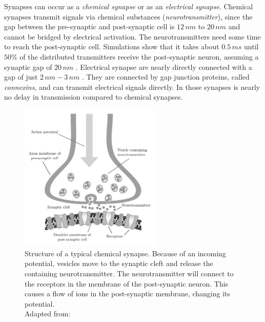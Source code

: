 Synapses can occur as a \emph{chemical synapse} or as an \emph{electrical synapse}. Chemical synapses transmit signals via chemical substances (\emph{neurotransmitter}), since the gap between the pre-synaptic and post-synaptic cell is $12\,nm$ to $20\,nm$ \parencite{savtchenko2007optimal} and cannot be bridged by electrical activation. The neurotransmitters need some time to reach the post-synaptic cell. Simulations show that it takes about $0.5\,ms$ until $50\%$ of the distributed transmitters receive the post-synaptic neuron, assuming a synaptic gap of $20\,nm$ \parencite{clements1996transmitter}. Electrical synapse are nearly directly connected with a gap of just $2\,nm - 3\,nm$ \parencite{peracchia1977gap}. They are connected by gap junction proteins, called \emph{connexins}, and can transmit electrical signals directly. In those synapses is nearly no delay in transmission compared to chemical synapses.

\begin{figure}[t]
	\centering
	\includegraphics[width=0.6\textwidth]{neurons_plasticity/synapse}
	\caption[Structure of a typical synapse]{Structure of a typical chemical synapse. Because of an incoming potential, vesicles move to the synaptic cleft and release the containing neurotransmitter. The neurotransmitter will connect to the receptors in the membrane of the post-synaptic neuron. This causes a flow of ions in the post-synaptic membrane, changing its potential.\\ Adapted from: \textcite[p. 73]{schandry2007biologische}}
	\label{fig:synapse}
\end{figure}

